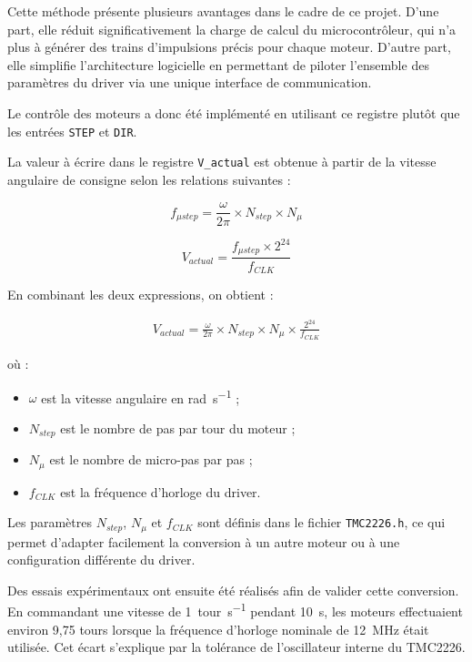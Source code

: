 Cette méthode présente plusieurs avantages dans le cadre de ce projet. D'une part, elle réduit significativement la charge de calcul du microcontrôleur, qui n'a plus à générer des trains d'impulsions précis pour chaque moteur. D'autre part, elle simplifie l'architecture logicielle en permettant de piloter l'ensemble des paramètres du driver via une unique interface de communication.

Le contrôle des moteurs a donc été implémenté en utilisant ce registre plutôt que les entrées \texttt{STEP} et \texttt{DIR}.

La valeur à écrire dans le registre \texttt{V\_actual} est obtenue à partir de la vitesse angulaire de consigne selon les relations suivantes :

$$
f_{\mu step}=\frac{\omega}{2\pi}\times N_{step}\times N_{\mu}
$$

$$
V_{actual}=\frac{f_{\mu step}\times2^{24}}{f_{CLK}}
$$

En combinant les deux expressions, on obtient :

\begin{equation}
\begin{aligned}
V_{actual}=
\frac{\omega}{2\pi}
\times
N_{step}
\times
N_{\mu}
\times
\frac{2^{24}}{f_{CLK}}
\end{aligned}
\end{equation}

où :
\begin{itemize}
    \item $\omega$ est la vitesse angulaire en \si{rad.s^{-1}} ;
    \item $N_{step}$ est le nombre de pas par tour du moteur ;
    \item $N_{\mu}$ est le nombre de micro-pas par pas ;
    \item $f_{CLK}$ est la fréquence d'horloge du driver.
\end{itemize}

Les paramètres $N_{step}$, $N_{\mu}$ et $f_{CLK}$ sont définis dans le fichier \texttt{TMC2226.h}, ce qui permet d'adapter facilement la conversion à un autre moteur ou à une configuration différente du driver.

Des essais expérimentaux ont ensuite été réalisés afin de valider cette conversion. En commandant une vitesse de \SI{1}{tour.s^{-1}} pendant \SI{10}{s}, les moteurs effectuaient environ 9,75 tours lorsque la fréquence d'horloge nominale de \SI{12}{MHz} était utilisée. Cet écart s'explique par la tolérance de l'oscillateur interne du TMC2226.

